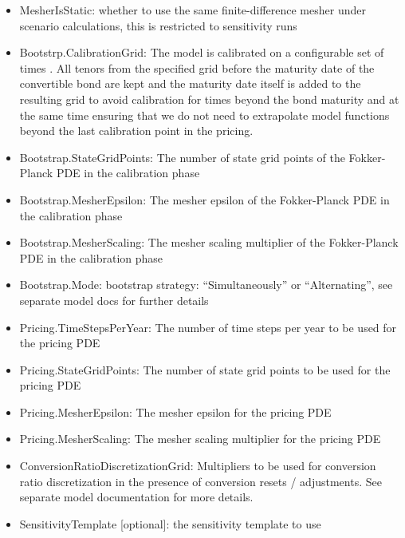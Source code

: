 \begin{itemize}
  as described above, but rather added as a spread on top of the credit curve, i.e. it is added to $h(t,e^z)$. For
  exchangeables, the security spread is added to {\em both} $h^B$ and $h^S$, i.e. it simultaneously increases the credit
  pread of both the equity and the bond component. Since the security spread is understood as an effective discounting
  spread, it is scaled by $s \rightarrow s / (1-\rho)$ before it is added to $h$, where $\rho$ is the recovery rate of
  the bond.
\item MesherIsStatic: whether to use the same finite-difference mesher under scenario calculations, this is restricted
  to sensitivity runs
\item Bootstrp.CalibrationGrid: The model is calibrated on a configurable set of times . All tenors from the specified
  grid before the maturity date of the convertible bond are kept and the maturity date itself is added to the resulting
  grid to avoid calibration for times beyond the bond maturity and at the same time ensuring that we do not need to
  extrapolate model functions beyond the last calibration point in the pricing.
\item Bootstrap.StateGridPoints: The number of state grid points of the Fokker-Planck PDE in the calibration phase
\item Bootstrap.MesherEpsilon: The mesher epsilon of the Fokker-Planck PDE in the calibration phase
\item Bootstrap.MesherScaling: The mesher scaling multiplier of the Fokker-Planck PDE in the calibration phase
\item Bootstrap.Mode: bootstrap strategy: ``Simultaneously'' or  ``Alternating'', see separate model docs for further details
\item Pricing.TimeStepsPerYear: The number of time steps per year to be used for the pricing PDE
\item Pricing.StateGridPoints: The number of state grid points to be used for the pricing PDE
\item Pricing.MesherEpsilon: The mesher epsilon for the pricing PDE
\item Pricing.MesherScaling: The mesher scaling multiplier for the pricing PDE
\item ConversionRatioDiscretizationGrid: Multipliers to be used for conversion ratio discretization in the presence of
  conversion resets / adjustments. See separate model documentation for more details.
\item SensitivityTemplate [optional]: the sensitivity template to use
\end{itemize}

